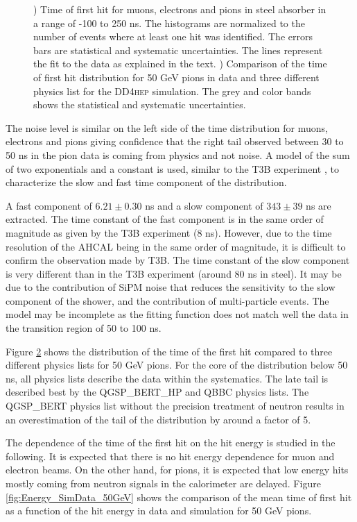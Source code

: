 \documentclass{JINST}
\newcommand\ddhep{\textsc{DD4hep}\xspace}
\begin{document}
\begin{figure}[htbp!]
\begin{subfigure}[t]{0.49\textwidth}
    \caption{}\label{fig:dNdt_SimData_50GeV_DD4hep}
  \end{subfigure}
  \caption{) Time of first hit for muons, electrons and pions in steel absorber in a range of -100 to 250 ns. The histograms are normalized to the number of events where at least one hit was identified. The errors bars are statistical and systematic uncertainties. The lines represent the fit to the data as explained in the text. ) Comparison of the time of first hit distribution for 50 GeV pions in data and three different physics list for the \ddhep simulation. The grey and color bands shows the statistical and systematic uncertainties.}
\end{figure}

The noise level is similar on the left side of the time distribution for muons, electrons and pions giving confidence that the right tail observed between 30 to 50 ns in the pion data is coming from physics and not noise. A model of the sum of two exponentials and a constant is used, similar to the T3B experiment \cite{Simon2013}, to characterize the slow and fast time component of the distribution.

A fast component of $6.21 \pm 0.30$ ns and a slow component of $343 \pm 39$ ns are extracted. The time constant of the fast component is in the same order of magnitude as given by the T3B experiment (8 ns). However, due to the time resolution of the AHCAL being in the same order of magnitude, it is difficult to confirm the observation made by T3B. The time constant of the slow component is very different than in the T3B experiment (around 80 ns in steel). It may be due to the contribution of SiPM noise that reduces the sensitivity to the slow component of the shower, and the contribution of multi-particle events. The model may be incomplete as the fitting function does not match well the data in the transition region of 50 to 100 ns.

Figure \ref{fig:dNdt_SimData_50GeV_DD4hep} shows the distribution of the time of the first hit compared to three different physics lists for 50 GeV pions. For the core of the distribution below 50 ns, all physics lists describe the data within the systematics. The late tail is described best by the QGSP\_BERT\_HP and QBBC physics lists. The QGSP\_BERT physics list without the precision treatment of neutron results in an overestimation of the tail of the distribution by around a factor of 5.

The dependence of the time of the first hit on the hit energy is studied in the following. It is expected that there is no hit energy dependence for muon and electron beams. On the other hand, for pions, it is expected that low energy hits mostly coming from neutron signals in the calorimeter are delayed. Figure \ref{fig:Energy_SimData_50GeV} shows the comparison of the mean time of first hit as a function of the hit energy in data and simulation for 50 GeV pions.
\end{document}
